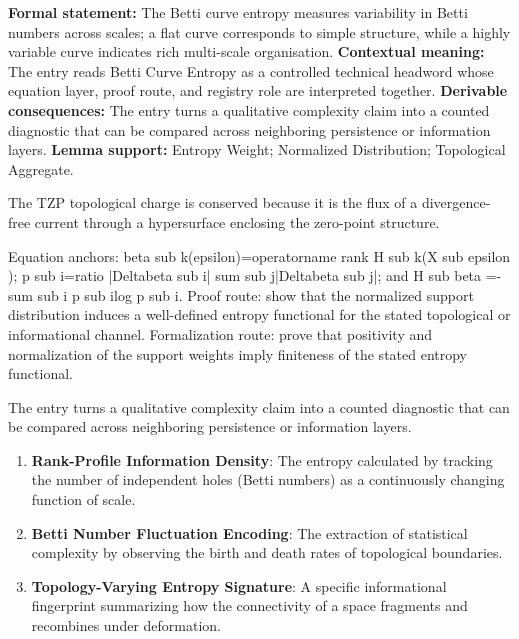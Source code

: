 \begingroup\footnotesize\setlength{\emergencystretch}{3em}\sloppy
\textbf{Formal statement:} The Betti curve entropy measures variability in Betti numbers across scales; a flat curve corresponds to simple structure, while a highly variable curve indicates rich multi-scale organisation. \textbf{Contextual meaning:} The entry reads Betti Curve Entropy as a controlled technical headword whose equation layer, proof route, and registry role are interpreted together. \textbf{Derivable consequences:} The entry turns a qualitative complexity claim into a counted diagnostic that can be compared across neighboring persistence or information layers. \textbf{Lemma support:} Entropy Weight; Normalized Distribution; Topological Aggregate.\par
\endgroup

The TZP topological charge is conserved because it is the flux of a divergence-free current through a hypersurface enclosing the zero-point structure.

Equation anchors: beta sub k(epsilon)=operatorname rank H sub k(X sub epsilon ); p sub i=ratio |Deltabeta sub i| sum sub j|Deltabeta sub j|; and H sub beta =-sum sub i p sub ilog p sub i. Proof route: show that the normalized support distribution induces a well-defined entropy functional for the stated topological or informational channel. Formalization route: prove that positivity and normalization of the support weights imply finiteness of the stated entropy functional.

The entry turns a qualitative complexity claim into a counted diagnostic that can be compared across neighboring persistence or information layers.
\endgroup

\begin{enumerate}[leftmargin=1.6em,itemsep=6pt,topsep=4pt]
\item \textbf{Rank-Profile Information Density}: The entropy calculated by tracking the number of independent holes (Betti numbers) as a continuously changing function of scale.
\item \textbf{Betti Number Fluctuation Encoding}: The extraction of statistical complexity by observing the birth and death rates of topological boundaries.
\item \textbf{Topology-Varying Entropy Signature}: A specific informational fingerprint summarizing how the connectivity of a space fragments and recombines under deformation.
\end{enumerate}

